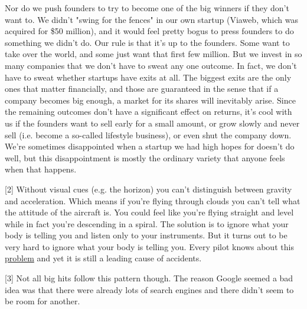 Nor do we push founders to try to become
                    one of the big winners if they don't want to. We didn't
                    "swing for the fences" in our own startup (Viaweb, which was
                    acquired for \$50 million), and it would feel pretty bogus to
                    press founders to do something we didn't do. Our rule is
                    that it's up to the founders. Some want to take over the
                    world, and some just want that first few million. But we
                    invest in so many companies that we don't have to sweat any
                    one outcome. In fact, we don't have to sweat whether
                    startups have exits at all. The biggest exits are the only
                    ones that matter financially, and those are guaranteed in
                    the sense that if a company becomes big enough, a market for
                    its shares will inevitably arise. Since the remaining
                    outcomes don't have a significant effect on returns, it's
                    cool with us if the founders want to sell early for a small
                    amount, or grow slowly and never sell (i.e. become a
                    so-called lifestyle business), or even shut the company
                    down. We're sometimes disappointed when a startup we had
                    high hopes for doesn't do well, but this disappointment is
                    mostly the ordinary variety that anyone feels when that
                    happens.

[2] Without visual cues (e.g. the horizon) you can't
                    distinguish between gravity and acceleration. Which means if
                    you're flying through clouds you can't tell what the
                    attitude of the aircraft is. You could feel like you're
                    flying straight and level while in fact you're descending in
                    a spiral. The solution is to ignore what your body is
                    telling you and listen only to your instruments. But it
                    turns out to be very hard to ignore what your body is
                    telling you. Every pilot knows about this
                    \href{http://en.wikipedia.org/wiki/Spatial\_disorientation}{problem}
                    and yet it is still a leading cause of accidents.

[3] Not all big hits follow this pattern though. The reason
                    Google seemed a bad idea was that there were already lots of
                    search engines and there didn't seem to be room for
                    another.

